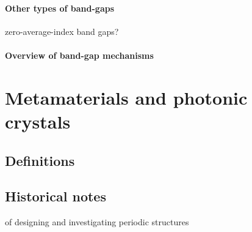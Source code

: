 
\paragraph{Other types of band-gaps}%
zero-average-index band gaps?

\paragraph{Overview of band-gap mechanisms}%


\section{Metamaterials and photonic crystals}
\subsection{Definitions} 

\subsection{Historical notes} 
of designing and investigating periodic structures

